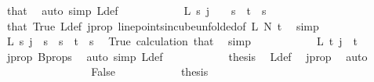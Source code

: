 \begin{isabellebody}
\ that\ \isamarkupfalse%
\ {\isacharparenleft}{\kern0pt}auto\ simp{\isacharcolon}{\kern0pt}\ L{\isacharprime}{\kern0pt}{\isacharunderscore}{\kern0pt}def{\isacharparenright}{\kern0pt}\isanewline
\ \ \ \ \ \ \ \ \isamarkupfalse%
\ \isamarkupfalse%
\ {\isachardoublequoteopen}L\ s\ j\ {\isacharequal}{\kern0pt}\ {}{\isachardoublequoteclose}\ \ {\isachardoublequoteopen}s\ {\isacharless}{\kern0pt}\ t{\isachardoublequoteclose}\ \ s\ \ \isamarkupfalse%
\ that\ True\ L{\isacharunderscore}{\kern0pt}def\ j{\isacharunderscore}{\kern0pt}prop\ line{\isacharunderscore}{\kern0pt}points{\isacharunderscore}{\kern0pt}in{\isacharunderscore}{\kern0pt}cube{\isacharunderscore}{\kern0pt}unfolded{\isacharbrackleft}{\kern0pt}of\ L\ N{\isacharprime}{\kern0pt}\ t{\isacharbrackright}{\kern0pt}\ \isamarkupfalse%
\ simp\isanewline
\ \ \ \ \ \ \ \ \isamarkupfalse%
\ \isamarkupfalse%
\ {\isachardoublequoteopen}L{\isacharprime}{\kern0pt}\ s\ j\ {\isacharequal}{\kern0pt}\ s{\isachardoublequoteclose}\ \ {\isachardoublequoteopen}s\ {\isacharless}{\kern0pt}\ t{\isachardoublequoteclose}\ \ s\ \isamarkupfalse%
\ True\ calculation\ that\ \isamarkupfalse%
\ simp\isanewline
\ \ \ \ \ \ \ \ \isamarkupfalse%
\ \isamarkupfalse%
\ {\isachardoublequoteopen}L{\isacharprime}{\kern0pt}\ t\ j\ {\isacharequal}{\kern0pt}\ t{\isachardoublequoteclose}\ \isamarkupfalse%
\ j{\isacharunderscore}{\kern0pt}prop\ B{\isacharunderscore}{\kern0pt}props\ \isamarkupfalse%
\ {\isacharparenleft}{\kern0pt}auto\ simp{\isacharcolon}{\kern0pt}\ L{\isacharprime}{\kern0pt}{\isacharunderscore}{\kern0pt}def{\isacharparenright}{\kern0pt}\isanewline
\ \ \ \ \ \ \ \ \isamarkupfalse%
\ \isamarkupfalse%
\ {\isacharquery}{\kern0pt}thesis\ \isamarkupfalse%
\ L{\isacharprime}{\kern0pt}{\isacharunderscore}{\kern0pt}def\ \isamarkupfalse%
\ j{\isacharunderscore}{\kern0pt}prop\ \isamarkupfalse%
\ auto\isanewline
\ \ \ \ \ \ \isamarkupfalse%
\isanewline
\ \ \ \ \ \ \ \ \isamarkupfalse%
\ False\isanewline
\ \ \ \ \ \ \ \ \isamarkupfalse%
\ \isamarkupfalse%
\ {\isacharquery}{\kern0pt}thesis\isanewline
\ \ \ \ \ \ \ \ \isamarkupfalse%
{\isacharminus}{\kern0pt}\isanewline
\ \ \ \ \ \ \ \ \ \ \isamarkupfalse%

\end{isabellebody}
